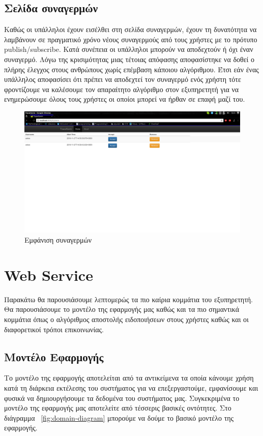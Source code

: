 \subsection{Σελίδα συναγερμών}
Καθώς οι υπάλληλοι έχουν εισέλθει στη σελίδα συναγερμών, έχουν τη δυνατότητα να λαμβάνουν σε πραγματικό χρόνο νέους συναγερμούς από τους χρήστες με το πρότυπο publish/subscribe. Κατά συνέπεια οι υπάλληλοι μπορούν να αποδεχτούν ή όχι έναν συναγερμό. Λόγω της κρισιμότητας μιας τέτοιας απόφασης αποφασίστηκε να δοθεί ο πλήρης έλεγχος στους ανθρώπους χωρίς επέμβαση κάποιου αλγόριθμου. Έτσι εάν ένας υπάλληλος αποφασίσει ότι πρέπει να αποδεχτεί τον συναγερμό ενός χρήστη τότε φροντίζουμε να καλέσουμε τον απαραίτητο αλγόριθμο στον εξυπηρετητή για να ενημερώσουμε όλους τους χρήστες οι οποίοι μπορεί να ήρθαν σε επαφή μαζί του.

\begin{figure}[h]
  \centering
  \includegraphics[width=150mm]{images/alerts.png}
  \caption{Εμφάνιση συναγερμών}
  \label{fig:login-webapp}
\end{figure}

\newpage

\section{Web Service}
Παρακάτω θα παρουσιάσουμε λεπτομερώς τα πιο καίρια κομμάτια του εξυπηρετητή. Θα παρουσιάσουμε το μοντέλο της εφαρμογής μας καθώς και τα πιο σημαντικά κομμάτια όπως ο αλγόριθμος αποστολής ειδοποιήσεων στους χρήστες καθώς και οι διαφορετικοί τρόποι επικοινωνίας.

\subsection{Μοντέλο Εφαρμογής}
Το μοντέλο της εφαρμογής αποτελείται από τα αντικείμενα τα οποία κάνουμε χρήση κατά τη διάρκεια εκτέλεσης του συστήματος για να επεξεργαστούμε, εμφανίσουμε και φυσικά να δημιουργήσουμε τα δεδομένα του συστήματος μας. Συγκεκριμένα το μοντέλο της εφαρμογής μας αποτελείτε από τέσσερις βασικές οντότητες. Στο διάγραμμα ~\ref{fig:domain-diagram} μπορούμε να δούμε το βασικό μοντέλο της εφαρμογής.

